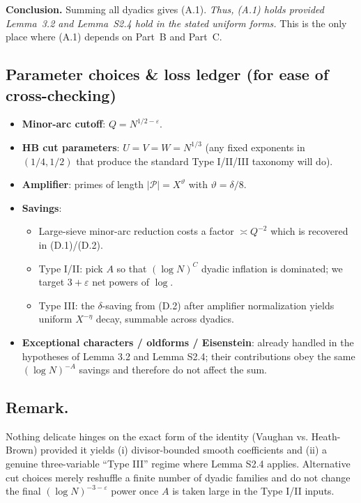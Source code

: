 \documentclass[11pt]{article}
\theoremstyle{definition}
\theoremstyle{remark}
\begin{document}
\medskip
\noindent\textbf{Conclusion.} Summing all dyadics gives (A.1). \emph{Thus, (A.1) holds provided Lemma~3.2 and Lemma~S2.4 hold in the stated uniform forms.} This is the only place where (A.1) depends on Part~B and Part~C.

\subsection*{Parameter choices \& loss ledger (for ease of cross-checking)}

\begin{itemize}
	\item \textbf{Minor-arc cutoff}: $Q=N^{1/2-\varepsilon}$.
	\item \textbf{HB cut parameters}: $U=V=W=N^{1/3}$ (any fixed exponents in $(1/4,1/2)$ that produce the standard Type I/II/III taxonomy will do).
	\item \textbf{Amplifier}: primes of length $|\mathcal P|=X^\vartheta$ with $\vartheta=\delta/8$.
	\item \textbf{Savings}:
	      \begin{itemize}
		      \item Large-sieve minor-arc reduction costs a factor $\asymp Q^{-2}$ which is recovered in (D.1)/(D.2).
		      \item Type I/II: pick $A$ so that $(\log N)^C$ dyadic inflation is dominated; we target $3+\varepsilon$ net powers of $\log$.
		      \item Type III: the $\delta$-saving from (D.2) after amplifier normalization yields uniform $X^{-\eta}$ decay, summable across dyadics.
	      \end{itemize}
	\item \textbf{Exceptional characters / oldforms / Eisenstein}: already handled in the hypotheses of Lemma 3.2 and Lemma S2.4; their contributions obey the same $(\log N)^{-A}$ savings and therefore do not affect the sum.
\end{itemize}

\subsection*{Remark.}

Nothing delicate hinges on the exact form of the identity (Vaughan vs. Heath-Brown) provided it yields (i) divisor-bounded smooth coefficients and (ii) a genuine three-variable “Type III” regime where Lemma S2.4 applies. Alternative cut choices merely reshuffle a finite number of dyadic families and do not change the final $(\log N)^{-3-\varepsilon}$ power once $A$ is taken large in the Type I/II inputs.
\end{document}
